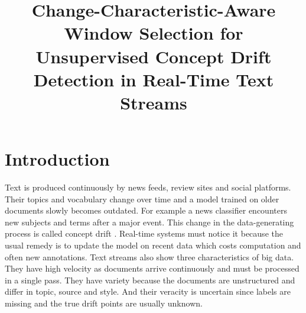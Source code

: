 \documentclass[conference]{IEEEtran}
\begin{document}
\title{Change-Characteristic-Aware Window Selection for Unsupervised Concept Drift Detection in Real-Time Text Streams}

\makeatletter
\newcommand{\linebreakand}{\end{@IEEEauthorhalign}\hfill\mbox{}\par\mbox{}\hfill\begin{@IEEEauthorhalign}}
\makeatother


\maketitle

\section{Introduction}

Text is produced continuously by news feeds, review sites and social platforms. Their topics and vocabulary change over time and a model trained on older documents slowly becomes outdated. For example a news classifier encounters new subjects and terms after a major event. This change in the data-generating process is called concept drift \cite{gama2014,lu2019}. Real-time systems must notice it because the usual remedy is to update the model on recent data which costs computation and often new annotations. Text streams also show three characteristics of big data. They have high velocity as documents arrive continuously and must be processed in a single pass. They have variety because the documents are unstructured and differ in topic, source and style. And their veracity is uncertain since labels are missing and the true drift points are usually unknown.
\end{document}
